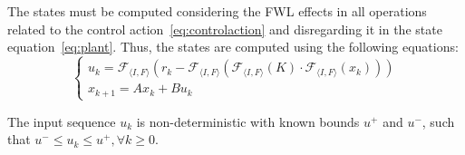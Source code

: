 \documentclass[runningheads,a4paper]{llncs}
\begin{document}
The states must be computed considering 
the FWL effects in all operations related to the control action~\eqref{eq:controlaction} 
and disregarding it in the state equation~\eqref{eq:plant}. 
Thus, the states are computed using the following equations:
%
\begin{equation}
\label{eq:ssunroll}
\left\lbrace
\begin{array}{l}
u_{k}=\mathcal{F}_{\langle I,F \rangle}(r_{k}-\mathcal{F}_{\langle I,F \rangle}(\mathcal{F}_{\langle I,F \rangle}(K)\cdot\mathcal{F}_{\langle I,F \rangle}(x_{k})))\\
x_{k+1}=Ax_{k}+Bu_{k}
\end{array}\right.
\end{equation}

The input sequence $u_{k}$ is non-deterministic with known bounds $u^{+}$ and $u^{-}$, such that ${u^{-} \leq u_{k} \leq u^{+}},\forall k\geq 0$. 



\end{document}

